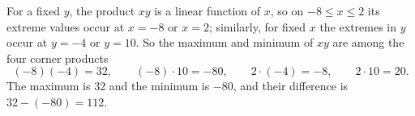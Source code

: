 For a fixed $y$, the product $xy$ is a linear function of $x$, so on $-8\le x\le2$ its extreme values occur at $x=-8$ or $x=2$; similarly, for fixed $x$ the extremes in $y$ occur at $y=-4$ or $y=10$. So the maximum and minimum of $xy$ are among the four corner products
\[(-8)(-4)=32,\qquad(-8)\cdot10=-80,\qquad2\cdot(-4)=-8,\qquad2\cdot10=20 .\]
The maximum is $32$ and the minimum is $-80$, and their difference is $32-(-80)=\boxed{112}$.
